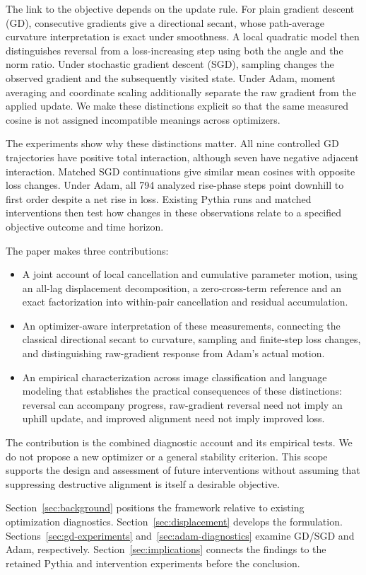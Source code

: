 The link to the objective depends on the update rule. For plain gradient
descent (GD), consecutive gradients give a directional secant, whose
path-average curvature interpretation is exact under smoothness. A local
quadratic model then distinguishes reversal from a loss-increasing step using
both the angle and the norm ratio. Under stochastic gradient descent (SGD),
sampling changes the observed gradient and the subsequently visited state.
Under Adam, moment averaging and coordinate scaling additionally separate the
raw gradient from the applied update. We make these distinctions explicit so
that the same measured cosine is not assigned incompatible meanings across
optimizers.

The experiments show why these distinctions matter. All nine controlled GD
trajectories have positive total interaction, although seven have negative
adjacent interaction. Matched SGD continuations give similar mean cosines
with opposite loss changes. Under Adam, all 794 analyzed rise-phase steps
point downhill to first order despite a net rise in loss. Existing Pythia
runs and matched interventions then test how changes in these observations
relate to a specified objective outcome and time horizon.

The paper makes three contributions:
\begin{itemize}
 \item A joint account of local cancellation and cumulative parameter motion,
 using an all-lag displacement decomposition, a zero-cross-term reference and
 an exact factorization into within-pair cancellation and residual accumulation.
 \item An optimizer-aware interpretation of these measurements, connecting the
 classical directional secant to curvature, sampling and finite-step loss
 changes, and distinguishing raw-gradient response from Adam's actual motion.
 \item An empirical characterization across image classification and language
 modeling that establishes the practical consequences of these distinctions:
 reversal can accompany progress, raw-gradient reversal need not imply an
 uphill update, and improved alignment need not imply improved loss.
\end{itemize}
The contribution is the combined diagnostic account and its empirical tests.
We do not propose a new optimizer or a general stability criterion. This scope
supports the design and assessment of future interventions without assuming
that suppressing destructive alignment is itself a desirable objective.

Section~\ref{sec:background} positions the framework relative to existing
optimization diagnostics. Section~\ref{sec:displacement} develops the
formulation. Sections~\ref{sec:gd-experiments} and~\ref{sec:adam-diagnostics}
examine GD/SGD and Adam, respectively. Section~\ref{sec:implications} connects
the findings to the retained Pythia and intervention experiments before the
conclusion.
